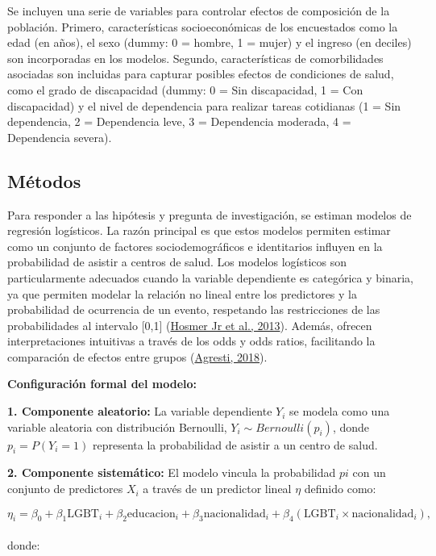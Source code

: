 \documentclass[
  12pt,
  a4paper,
]{article}
\begin{document}
Se incluyen una serie de variables para controlar efectos de composición de la población. Primero, características socioeconómicas de los encuestados como la edad (en años), el sexo (dummy: 0 = hombre, 1 = mujer) y el ingreso (en deciles) son incorporadas en los modelos. Segundo, características de comorbilidades asociadas son incluidas para capturar posibles efectos de condiciones de salud, como el grado de discapacidad (dummy: 0 = Sin discapacidad, 1 = Con discapacidad) y el nivel de dependencia para realizar tareas cotidianas (1 = Sin dependencia, 2 = Dependencia leve, 3 = Dependencia moderada, 4 = Dependencia severa).

\hypertarget{muxe9todos}{%
\subsection{Métodos}\label{muxe9todos}}

Para responder a las hipótesis y pregunta de investigación, se estiman modelos de regresión logísticos. La razón principal es que estos modelos permiten estimar como un conjunto de factores sociodemográficos e identitarios influyen en la probabilidad de asistir a centros de salud. Los modelos logísticos son particularmente adecuados cuando la variable dependiente es categórica y binaria, ya que permiten modelar la relación no lineal entre los predictores y la probabilidad de ocurrencia de un evento, respetando las restricciones de las probabilidades al intervalo {[}0,1{]} (\protect\hyperlink{ref-hosmer2013applied}{Hosmer Jr et al., 2013}). Además, ofrecen interpretaciones intuitivas a través de los odds y odds ratios, facilitando la comparación de efectos entre grupos (\protect\hyperlink{ref-agresti2018introduction}{Agresti, 2018}).

\textbf{Configuración formal del modelo:}

\textbf{1. Componente aleatorio:} La variable dependiente \(Y_i\) se modela como una variable aleatoria con distribución Bernoulli, \(Y_i \sim Bernoulli(p_i)\), donde \(p_i= P (Y_i = 1)\) representa la probabilidad de asistir a un centro de salud.

\textbf{2. Componente sistemático:} El modelo vincula la probabilidad \(pi\) con un conjunto de predictores \(X_i\) a través de un predictor lineal \(\eta\) definido como:

\[
\eta_i = \beta_0 + \beta_1 \text{LGBT}_i + \beta_2 \text{educacion}_i + \beta_3 \text{nacionalidad}_i + \beta_4 (\text{LGBT}_i \times \text{nacionalidad}_i),
\]\\
donde:
\end{document}

